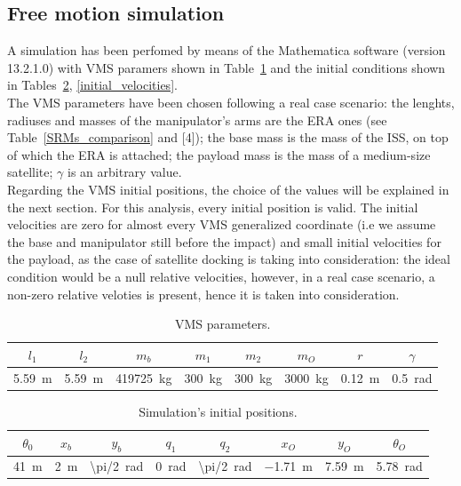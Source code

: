 \documentclass[a4paper,12pt,oneside]{report}
\begin{document}
\subsection{Free motion simulation}
A simulation has been perfomed by means of the Mathematica software (version 13.2.1.0) with VMS paramers shown in Table~\ref{VMS_parameters} and the initial conditions shown in Tables~\ref{initial_positions}, \ref{initial_velocities}.\\
The VMS parameters have been chosen following a real case scenario: the lenghts, radiuses and masses of the manipulator's arms are the ERA ones (see Table~\ref{SRMs_comparison} and [4]); the base mass is the mass of the ISS, on top of which the ERA is attached; the payload mass is the mass of a medium-size satellite; $\gamma$ is an arbitrary value.\\
Regarding the VMS initial positions, the choice of the values will be explained in the next section. For this analysis, every initial position is valid. The initial velocities are zero for almost every VMS generalized coordinate (i.e we assume the base and manipulator still before the impact) and small initial velocities for the payload, as the case of satellite docking is taking into consideration: the ideal condition would be a null relative velocities, however, in a real case scenario, a non-zero relative veloties is present, hence it is taken into consideration.\\
\begin{table}
  \caption{VMS parameters.}
  \label{VMS_parameters}
  \begin{center}
  \begin{tabular}{cccccccc}
    \toprule
    $l_1$&$l_2$&$m_b$&$m_1$&$m_2$&$m_O$&$r$&$\gamma$\\
  \midrule
    \SI{5.59}{\metre}&\SI{5.59}{\metre}&\SI{419725}{\kilogram}&\SI{300}{\kilogram}&\SI{300}{\kilogram}&\SI{3000}{\kilogram}&\SI{0.12}{\metre}&\SI{0.5}{\radian}\\
  \bottomrule
  \end{tabular}
  \end{center}
\end{table}
\begin{table}
  \caption{Simulation's initial positions.}
  \label{initial_positions}
  \begin{center}
  \begin{tabular}{cccccccc}
    \toprule
    $\theta_0$&$x_b$&$y_b$&$q_1$&$q_2$&$x_O$&$y_O$&$\theta_O$\\
  \midrule
    \SI{41}{\metre}&\SI{2}{\metre}&\SI[parse-numbers = false]{\pi/2}{\radian}&\SI{0}{\radian}&\SI[parse-numbers = false]{\pi/2}{\radian}&\SI{-1.71}{\metre}&\SI{7.59}{\metre}&\SI{5.78}{\radian}\\
  \bottomrule
  \end{tabular}
  \end{center}
\end{table}
\end{document}
